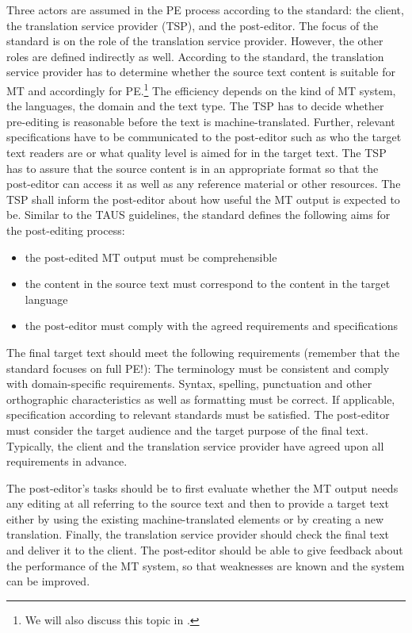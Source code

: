 Three actors are assumed in the PE process according to the standard: the client, the translation service provider (TSP), and the post-editor. The focus of the standard is on the role of the translation service provider. However, the other roles are defined indirectly as well. According to the standard, the translation service provider has to determine whether the source text content is suitable for MT and accordingly for PE.\footnote{We will also discuss this topic in .} The efficiency depends on the kind of MT system, the languages, the domain and the text type. The TSP has to decide whether pre-editing is reasonable before the text is machine-translated. Further, relevant specifications have to be communicated to the post-editor such as who the target text readers are or what quality level is aimed for in the target text. The TSP has to assure that the source content is in an appropriate format so that the post-editor can access it as well as any reference material or other resources. The TSP shall inform the post-editor about how useful the MT output is expected to be. Similar to the TAUS guidelines, the standard defines the following aims for the post-editing process: 
\begin{itemize}
    \item the post-edited MT output must be comprehensible
    \item the content in the source text must correspond to the content in the target language
    \item the post-editor must comply with the agreed requirements and specifications
\end{itemize}

The final target text should meet the following requirements (remember that the standard focuses on full PE!): The terminology must be consistent and comply with domain-specific requirements. Syntax, spelling, punctuation and other orthographic characteristics as well as formatting must be correct. If applicable, specification according to relevant standards must be satisfied. The post-editor must consider the target audience and the target purpose of the final text. Typically, the client and the translation service provider have agreed upon all requirements in advance.

The post-editor’s tasks should be to first evaluate whether the MT output needs any editing at all referring to the source text and then to provide a target text either by using the existing machine-translated elements or by creating a new translation. Finally, the translation service provider should check the final text and deliver it to the client. The post-editor should be able to give feedback about the performance of the MT system, so that weaknesses are known and the system can be improved.

